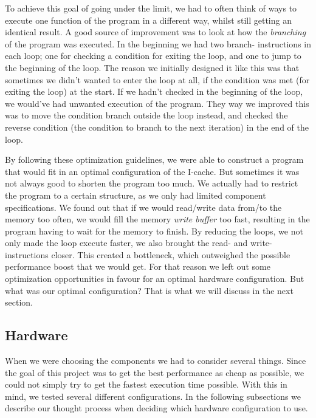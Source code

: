 \documentclass[a4paper,9pt,fleqn]{article}
\begin{document}
To achieve this goal of going under the limit, we had to often think of ways to execute one function of the
program in a different way, whilst still getting an identical result. A good source of improvement was to 
look at how the {\it branching} of the program was executed. In the beginning we had two branch-
instructions in each loop; one for checking a condition for exiting the loop, and one to jump to the 
beginning of the loop. The reason we initially designed it like this was that sometimes we didn't wanted to 
enter the loop at all, if the condition was met (for exiting the loop) at the start. If we hadn't checked in the 
beginning of the loop, we would've had unwanted execution of the program. They way we improved this 
was to move the condition branch outside the loop instead, and checked the reverse condition (the 
condition to branch to the next iteration) in the end of the loop.

By following these optimization guidelines, we were able to construct a program that would fit in an 
optimal configuration of the I-cache. But sometimes it was not always good to shorten the program too 
much. We actually had to restrict the program to a certain structure, as we only had limited component 
specifications. We found out that if we would read/write data from/to the memory too often, we would fill 
the memory {\it write buffer} too fast, resulting in the program having to wait for the memory to finish. By 
reducing the loops, we not only made the loop execute faster, we also brought the read- and write-
instructions closer. This created a bottleneck, which outweighed the possible performance boost that we 
would get. For that reason we left out some optimization opportunities in favour for an optimal hardware 
configuration. But what was our optimal configuration? That is what we will discuss in the next section.

\subsection{Hardware}
When we were choosing the components we had to consider several things. Since the goal of this project 
was to get the best performance as cheap as possible, we could not simply try to get the fastest execution 
time possible. With this in mind, we tested several different configurations. In the following subsections we 
describe our thought process when deciding which hardware configuration to use.
\end{document}
